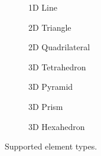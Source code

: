 
\begin{figure}[htb]
  \begin{centering}
    \begin{subfigure}{1.5in}
      \caption{1D Line}
      \label{FIG:Elem_1D_Line}
    \end{subfigure}%
    \begin{subfigure}{1.5in}
      \caption{2D Triangle}
      \label{FIG:Elem_2D_Tri}
    \end{subfigure}%
    \begin{subfigure}{1.5in}
      \caption{2D Quadrilateral} 
      \label{FIG:Elem_2D_Quad} 
    \end{subfigure}
    \begin{subfigure}{1.5in}
      \caption{3D Tetrahedron}
      \label{FIG:Elem_3D_Tet}
    \end{subfigure}%
    \begin{subfigure}{1.5in}
      \caption{3D Pyramid}
      \label{FIG:Elem_3D_Pyr}
    \end{subfigure}
    \begin{subfigure}{1.5in}
      \caption{3D Prism}
      \label{FIG:Elem_3D_Pri}
    \end{subfigure}%
    \begin{subfigure}{1.5in}
      \caption{3D Hexahedron}
      \label{FIG:Elem_3D_Hex}
    \end{subfigure}
    \caption{Supported element types.}
    \label{FIG:Element_Types}
  \end{centering}
\end{figure}


